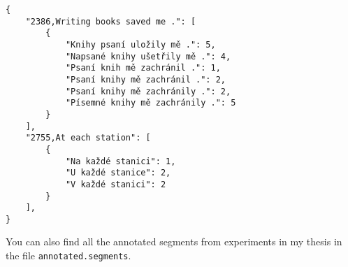 \begin{verbatim}
{
    "2386,Writing books saved me .": [
        {
            "Knihy psaní uložily mě .": 5,
            "Napsané knihy ušetřily mě .": 4,
            "Psaní knih mě zachránil .": 1,
            "Psaní knihy mě zachránil .": 2,
            "Psaní knihy mě zachránily .": 2,
            "Písemné knihy mě zachránily .": 5
        }
    ],
    "2755,At each station": [
        {
            "Na každé stanici": 1,
            "U každé stanice": 2,
            "V každé stanici": 2
        }
    ],
}
\end{verbatim}

\noindent
You can also find all the annotated segments from experiments in my thesis in
the file \texttt{annotated.segments}.
